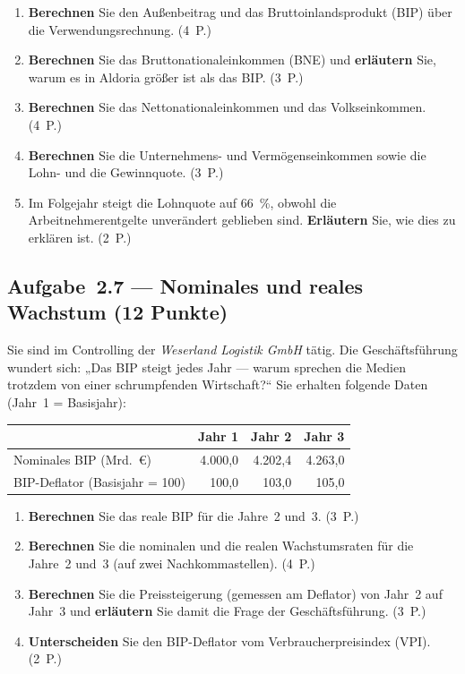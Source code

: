 \begin{enumerate}[label=\alph*)]
  \item \textbf{Berechnen} Sie den Außenbeitrag und das Bruttoinlandsprodukt (BIP) über
    die Verwendungsrechnung. \hfill (4~P.)
  \item \textbf{Berechnen} Sie das Bruttonationaleinkommen (BNE) und \textbf{erläutern} Sie,
    warum es in Aldoria größer ist als das BIP. \hfill (3~P.)
  \item \textbf{Berechnen} Sie das Nettonationaleinkommen und das Volkseinkommen.
    \hfill (4~P.)
  \item \textbf{Berechnen} Sie die Unternehmens- und Vermögenseinkommen sowie die Lohn- und
    die Gewinnquote. \hfill (3~P.)
  \item Im Folgejahr steigt die Lohnquote auf 66~\%, obwohl die Arbeitnehmerentgelte
    unverändert geblieben sind. \textbf{Erläutern} Sie, wie dies zu erklären ist.
    \hfill (2~P.)
\end{enumerate}

\subsection*{Aufgabe~2.7 --- Nominales und reales Wachstum (12 Punkte)}

Sie sind im Controlling der \emph{Weserland Logistik GmbH} tätig. Die Geschäftsführung
wundert sich: „Das BIP steigt jedes Jahr --- warum sprechen die Medien trotzdem von einer
schrumpfenden Wirtschaft?`` Sie erhalten folgende Daten (Jahr~1 = Basisjahr):

\begin{center}
\begin{tabular}{l r r r}
\toprule
\rowcolor{bfwTabHead} & \textbf{Jahr 1} & \textbf{Jahr 2} & \textbf{Jahr 3}\\
\midrule
Nominales BIP (Mrd.~€) & 4.000,0 & 4.202,4 & 4.263,0\\
BIP-Deflator (Basisjahr = 100) & 100,0 & 103,0 & 105,0\\
\bottomrule
\end{tabular}
\end{center}

\begin{enumerate}[label=\alph*)]
  \item \textbf{Berechnen} Sie das reale BIP für die Jahre~2 und~3. \hfill (3~P.)
  \item \textbf{Berechnen} Sie die nominalen und die realen Wachstumsraten für die
    Jahre~2 und~3 (auf zwei Nachkommastellen). \hfill (4~P.)
  \item \textbf{Berechnen} Sie die Preissteigerung (gemessen am Deflator) von Jahr~2 auf
    Jahr~3 und \textbf{erläutern} Sie damit die Frage der Geschäftsführung. \hfill (3~P.)
  \item \textbf{Unterscheiden} Sie den BIP-Deflator vom Verbraucherpreisindex (VPI).
    \hfill (2~P.)
\end{enumerate}


